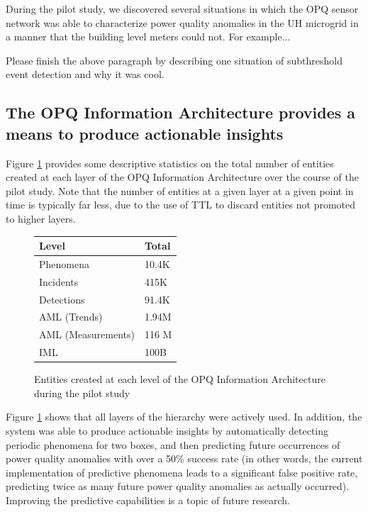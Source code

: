During the pilot study, we discovered several situations in which the OPQ sensor network was able to characterize power quality anomalies in the UH microgrid in a manner that the building level meters could not. For example...

\begin{tcolorbox}[colback=blue!5!white,colframe=blue!75!black,title=SERGE]
Please finish the above paragraph by describing one situation of subthreshold event detection and why it was cool.
\end{tcolorbox}

\subsection{The OPQ Information Architecture provides a means to produce actionable insights}

Figure \ref{fig:level-statistics} provides some descriptive statistics on the total number of entities created at each layer of the OPQ Information Architecture over the course of the pilot study. Note that the number of entities at a given layer at a given point in time is typically far less, due to the use of TTL to discard entities not promoted to higher layers.

\begin{figure}[ht]
  \centering
		 \begin{tabularx}{.4\textwidth}{lX}
       \toprule
       \textbf{Level} & \textbf{Total}  \\
       \midrule
       Phenomena & 10.4K \\
       Incidents & 415K \\
       Detections & 91.4K \\
       AML (Trends) & 1.94M \\
       AML (Measurements) & 116 M \\
       IML  & 100B \\
       \bottomrule
     \end{tabularx}
	\caption{Entities created at each level of the OPQ Information Architecture during the pilot study}
	\label{fig:level-statistics}
\end{figure}

Figure \ref{fig:level-statistics} shows that all layers of the hierarchy were actively used. In addition, the system was able to produce actionable insights by automatically detecting periodic phenomena for two boxes, and then predicting future occurrences of power quality anomalies with over a 50\% success rate (in other words, the current implementation of predictive phenomena leads to a significant false positive rate, predicting twice as many future power quality anomalies as actually occurred). Improving the predictive capabilities is a topic of future research.


